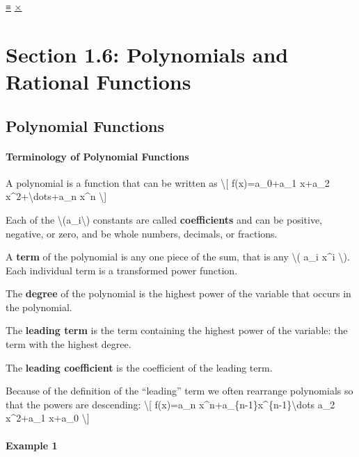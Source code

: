 \protect\hyperlink{main-nav}{≡} \protect\hyperlink{close-nav}{×}

\hypertarget{section-1.6-polynomials-and-rational-functions}{%
\section{Section 1.6: Polynomials and Rational
Functions}\label{section-1.6-polynomials-and-rational-functions}}

\hypertarget{polynomial-functions}{%
\subsection{Polynomial Functions}\label{polynomial-functions}}

\hypertarget{terminology-of-polynomial-functions}{%
\paragraph{Terminology of Polynomial
Functions}\label{terminology-of-polynomial-functions}}

A polynomial is a function that can be written as \textbackslash{}{[}
f(x)=a\_0+a\_1 x+a\_2 x\^{}2+\textbackslash{}dots+a\_n x\^{}n
\textbackslash{}{]}

Each of the \textbackslash{}(a\_i\textbackslash{}) constants are called
\textbf{coefficients} and can be positive, negative, or zero, and be
whole numbers, decimals, or fractions.

A \textbf{term} of the polynomial is any one piece of the sum, that is
any \textbackslash{}( a\_i x\^{}i \textbackslash{}). Each individual
term is a transformed power function.

The \textbf{degree} of the polynomial is the highest power of the
variable that occurs in the polynomial.

The \textbf{leading term} is the term containing the highest power of
the variable: the term with the highest degree.

The \textbf{leading coefficient} is the coefficient of the leading term.

Because of the definition of the ``leading'' term we often rearrange
polynomials so that the powers are descending: \textbackslash{}{[}
f(x)=a\_n x\^{}n+a\_\{n-1\}x\^{}\{n-1\}\textbackslash{}dots a\_2
x\^{}2+a\_1 x+a\_0 \textbackslash{}{]}

\hypertarget{example-1}{%
\paragraph{Example 1}\label{example-1}}

